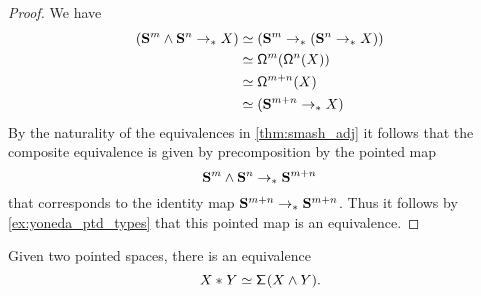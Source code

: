 \begin{proof}
We have
\begin{align*}
({\sphere{m}}\wedge{\sphere{n}}\to_\ast X) & \eqvsym (\sphere{m}\to_\ast (\sphere{n}\to_\ast X)) \\
& \eqvsym \loopspace[m]{\loopspace[n]{X}} \\
& \eqvsym \loopspace[m+n]{X} \\
& \eqvsym (\sphere{m+n}\to_\ast X)
\end{align*}
By the naturality of the equivalences in \cref{thm:smash_adj} it follows that the composite equivalence is given by precomposition by the pointed map 
\begin{equation*}
\sphere{m}\wedge\sphere{n}\to_\ast \sphere{m+n}
\end{equation*}
that corresponds to the identity map $\sphere{m+n}\to_\ast \sphere{m+n}$. Thus it follows by \cref{ex:yoneda_ptd_types} that this pointed map is an equivalence.
\end{proof}

\begin{thm}
Given two pointed spaces, there is an equivalence
\begin{equation*}
\eqv{\join{X}{Y}}{\susp(X\wedge Y)}.
\end{equation*}
\end{thm}

